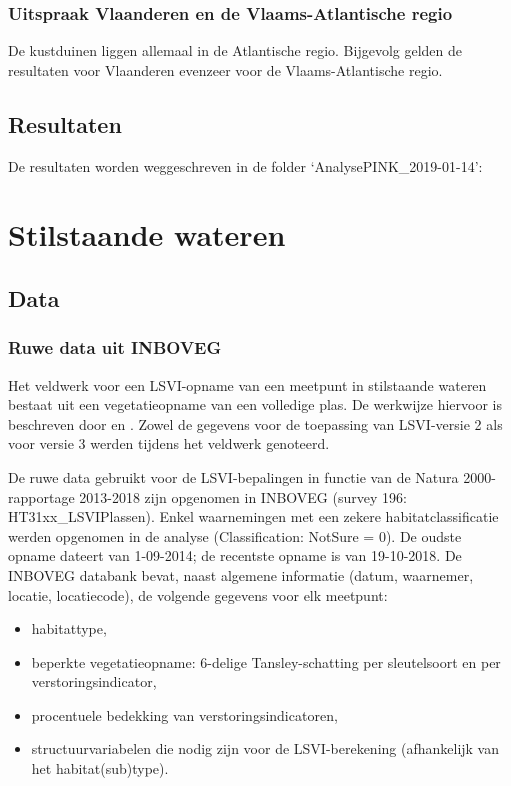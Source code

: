 \documentclass[twoside]{extreport}
\begin{document}
\subsection{Uitspraak Vlaanderen en de Vlaams-Atlantische
regio}\label{uitspraak-vlaanderen-en-de-vlaams-atlantische-regio-4}

De kustduinen liggen allemaal in de Atlantische regio. Bijgevolg gelden
de resultaten voor Vlaanderen evenzeer voor de Vlaams-Atlantische regio.

\section{Resultaten}\label{resultaten-4}

De resultaten worden weggeschreven in de folder
`AnalysePINK\_2019-01-14':

\chapter{Stilstaande wateren}\label{h:plassen}

\section{Data}\label{data-6}

\subsection{Ruwe data uit INBOVEG}\label{ruwe-data-uit-inboveg-3}

Het veldwerk voor een LSVI-opname van een meetpunt in stilstaande
wateren bestaat uit een vegetatieopname van een volledige plas. De
werkwijze hiervoor is beschreven door \citet{Oosterlynck2018} en
\citet{Westra2014}. Zowel de gegevens voor de toepassing van LSVI-versie
2 \citep{TJollyn2009} als voor versie 3 \citep{Oosterlynck2018} werden
tijdens het veldwerk genoteerd.

De ruwe data gebruikt voor de LSVI-bepalingen in functie van de Natura
2000-rapportage 2013-2018 zijn opgenomen in INBOVEG (survey 196:
HT31xx\_LSVIPlassen). Enkel waarnemingen met een zekere
habitatclassificatie werden opgenomen in de analyse (Classification:
NotSure = 0). De oudste opname dateert van 1-09-2014; de recentste
opname is van 19-10-2018. De INBOVEG databank bevat, naast algemene
informatie (datum, waarnemer, locatie, locatiecode), de volgende
gegevens voor elk meetpunt:

\begin{itemize}
\tightlist
\item
  habitattype,
\item
  beperkte vegetatieopname: 6-delige Tansley-schatting per sleutelsoort
  en per verstoringsindicator,
\item
  procentuele bedekking van verstoringsindicatoren,
\item
  structuurvariabelen die nodig zijn voor de LSVI-berekening
  (afhankelijk van het habitat(sub)type).
\end{itemize}
\end{document}
